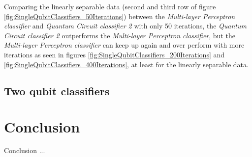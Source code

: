 Comparing the linearly separable data (second and third row of figure \ref{fig:SingleQubitClassifiers_50Iterations}) between the \textit{Multi-layer Perceptron classifier} and \textit{Quantum Circuit classifier 2} with only 50 iterations, the \textit{Quantum Circuit classifier 2} outperforms the \textit{Multi-layer Perceptron classifier}, but the \textit{Multi-layer Perceptron classifier} can keep up again and over perform with more iterations as seen in figures \ref{fig:SingleQubitClassifiers_200Iterations} and \ref{fig:SingleQubitClassifiers_400Iterations}, at least for the linearly separable data.

\subsection{Two qubit classifiers}


\section{Conclusion}
Conclusion ...
